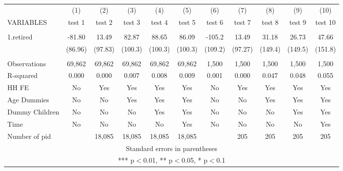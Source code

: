 \begin{tabular}{lcccccccccc} \hline
 & (1) & (2) & (3) & (4) & (5) & (6) & (7) & (8) & (9) & (10) \\
VARIABLES & test 1 & test 2 & test 3 & test 4 & test 5 & test 6 & test 7 & test 8 & test 9 & test 10 \\ \hline
 &  &  &  &  &  &  &  &  &  &  \\
1.retired & -81.80 & 13.49 & 82.87 & 88.65 & 86.09 & -105.2 & 13.49 & 31.18 & 26.73 & 47.66 \\
 & (86.96) & (97.83) & (100.3) & (100.3) & (100.3) & (109.2) & (97.27) & (149.4) & (149.5) & (151.8) \\
 &  &  &  &  &  &  &  &  &  &  \\
Observations & 69,862 & 69,862 & 69,862 & 69,862 & 69,862 & 1,500 & 1,500 & 1,500 & 1,500 & 1,500 \\
R-squared & 0.000 & 0.000 & 0.007 & 0.008 & 0.009 & 0.001 & 0.000 & 0.047 & 0.048 & 0.055 \\
HH FE & No & Yes & Yes & Yes & Yes & No & Yes & Yes & Yes & Yes \\
Age Dummies & No & No & Yes & Yes & Yes & No & No & Yes & Yes & Yes \\
Dummy Children & No & No & No & Yes & Yes & No & No & No & Yes & Yes \\
Time & No & No & No & No & Yes & No & No & No & No & Yes \\
 Number of pid &  & 18,085 & 18,085 & 18,085 & 18,085 &  & 205 & 205 & 205 & 205 \\ \hline
\multicolumn{11}{c}{ Standard errors in parentheses} \\
\multicolumn{11}{c}{ *** p$<$0.01, ** p$<$0.05, * p$<$0.1} \\
\end{tabular}

